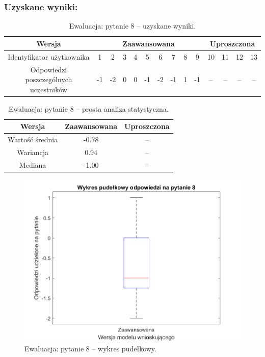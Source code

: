 	\subsubsection{Uzyskane wyniki:}
	
	\begin{table}[!h]
		\caption{Ewaluacja: pytanie 8 -- uzyskane wyniki.}
		\centering
		\begin{tabular}{|c|c|c|c|c|c|c|c|c|c|c|c|c|c|}
			\hline
			Wersja &  \multicolumn{9}{c|}{Zaawansowana} & \multicolumn{4}{c|}{Uproszczona}\\ \hline
			Identyfikator użytkownika             & 1 & 2 & 3 & 4 & 5 & 6 & 7 & 8 & 9 
			& 10 & 11 & 12 & 13 \\ \hline
			Odpowiedzi poszczególnych uczestników & -1 & -2 & 0 & 0 & -1 & -2 & -1 & 1 & -1
			& --  & -- & -- & -- \\ \hline
		\end{tabular}
	\end{table}
	
	\begin{table}[!h]
		\caption{Ewaluacja: pytanie 8 -- prosta analiza statystyczna.}
		\centering
		\begin{tabular}{|c|c|c|}
			\hline
			Wersja          & Zaawansowana & Uproszczona \\ \hline
			Wartość średnia & -0.78        & --          \\ \hline
			Wariancja       &  0.94        & --          \\ \hline
			Mediana         & -1.00        & --          \\ \hline
		\end{tabular}
	\end{table}
	\clearpage
	
	\begin{figure}[H]
		\centering
		\includegraphics[scale=0.8]{rozdzial5/Ewaluacja8.png}
		\caption{Ewaluacja: pytanie 8 -- wykres pudełkowy.}
	\end{figure}
	
